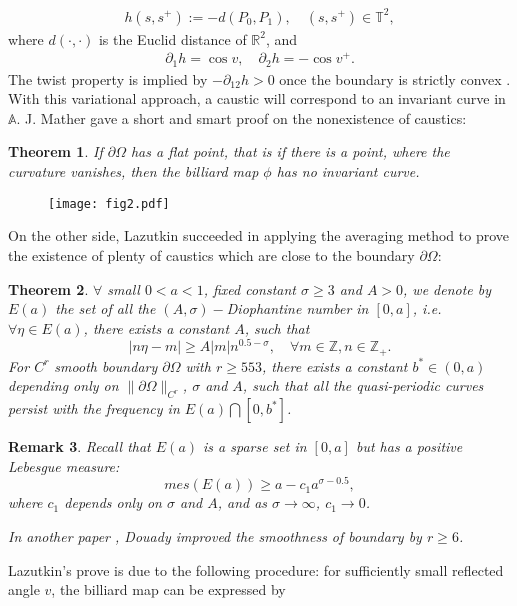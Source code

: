 \documentclass{amsart}
\newtheorem{thm}{Theorem}[section]
\newtheorem{rmk}[thm]{Remark}
\begin{document}
\begin{eqnarray}
h(s,s^+):=-d(P_0,P_1), \quad (s,s^+)\in{\mathbb{T}}^2, 
\end{eqnarray}
where $d(\cdot,\cdot)$ is the Euclid distance of ${\mathbb{R}}^2$, and
\begin{eqnarray}
\partial_1h=\cos v,\quad \partial_2h=-\cos v^+.
\end{eqnarray}
The twist property is implied by $-\partial_{12}h>0$ once the boundary is strictly convex \cite{M2}. With this variational approach, a caustic will correspond to an invariant curve in $\mathbb A$. J. Mather gave a short and smart proof on the nonexistence of caustics:
\begin{thm}\cite{Ma}
 If $\partial\Omega$ has a flat point, that is if there is a point, where the curvature vanishes, then the billiard map $\phi$ has no invariant curve.
\end{thm}
\begin{figure}
\begin{center}
\texttt{[image: fig2.pdf]}
\caption{ }
\label{fig2}
\end{center}
\end{figure}
On the other side, Lazutkin succeeded in applying the averaging method to prove the existence of plenty of caustics which are close to the boundary $\partial\Omega$:
\begin{thm}\cite{L}
$\forall$ small $0<a<1$, fixed constant $\sigma\geq3$ and $A>0$, we denote by $E(a)$ the set of all the $(A,\sigma)-$Diophantine number in $[0,a]$, i.e. $\forall \eta\in E(a)$, there exists a constant $A$, such that
\[
|n\eta-m|\geq A|m|n^{0.5-\sigma},\quad\forall m\in{\mathbb{Z}}, n\in{\mathbb{Z}}_+.
\]
For $C^r$ smooth boundary $\partial\Omega$ with $r\geq553$, there exists a constant $b^*\in(0,a)$ depending only on $\|\partial\Omega\|_{C^r}$, $\sigma$ and $A$, such that all the quasi-periodic curves persist with the frequency in $E(a)\bigcap[0,b^*]$. 
\end{thm} 
\begin{rmk}
Recall that $E(a)$ is a sparse set in $[0,a]$ but has a positive Lebesgue measure:
\[
mes(E(a))\geq a-c_1 a^{\sigma-0.5},
\]
where $c_1$ depends only on $\sigma$ and $A$, and as $\sigma\rightarrow\infty$, $c_1\rightarrow0$.

In another paper \cite{D}, Douady improved the smoothness of boundary by $r\geq 6$.
\end{rmk}
Lazutkin's prove is due to the following procedure: for sufficiently small reflected angle $v$, the billiard map can be expressed by
\end{document}
